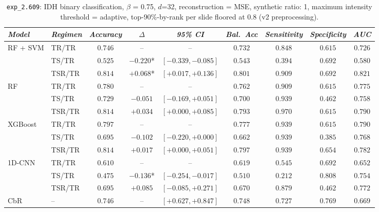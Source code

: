 \begin{table}[H]
\centering
\scriptsize

\label{tab:ctrl_exp_2.609}
\begin{tabular*}{\textwidth}{@{\extracolsep{\fill}}llccccccc}
\toprule
\emph{Model} & \emph{Regimen} & \emph{Accuracy} & \emph{$\Delta$} & \emph{95\% CI} & \emph{Bal.\ Acc} & \emph{Sensitivity} & \emph{Specificity} & \emph{AUC}\\
\midrule
\multirow{3}{*}{RF + SVM} & TR/TR & $0.746$ & -- & -- & $0.732$ & $0.848$ & $0.615$ & $0.726$\\
 & TS/TR & $0.525$ & $-0.220$* & $[-0.339, -0.085]$ & $0.543$ & $0.394$ & $0.692$ & $0.580$\\
 & TSR/TR & $0.814$ & $+0.068$* & $[+0.017, +0.136]$ & $0.801$ & $0.909$ & $0.692$ & $0.821$\\
\midrule
\multirow{3}{*}{RF} & TR/TR & $0.780$ & -- & -- & $0.762$ & $0.909$ & $0.615$ & $0.775$\\
 & TS/TR & $0.729$ & $-0.051$ & $[-0.169, +0.051]$ & $0.700$ & $0.939$ & $0.462$ & $0.758$\\
 & TSR/TR & $0.814$ & $+0.034$ & $[+0.000, +0.085]$ & $0.793$ & $0.970$ & $0.615$ & $0.790$\\
\midrule
\multirow{3}{*}{XGBoost} & TR/TR & $0.797$ & -- & -- & $0.777$ & $0.939$ & $0.615$ & $0.790$\\
 & TS/TR & $0.695$ & $-0.102$ & $[-0.220, +0.000]$ & $0.662$ & $0.939$ & $0.385$ & $0.768$\\
 & TSR/TR & $0.814$ & $+0.017$ & $[+0.000, +0.051]$ & $0.797$ & $0.939$ & $0.654$ & $0.782$\\
\midrule
\multirow{3}{*}{1D-CNN} & TR/TR & $0.610$ & -- & -- & $0.619$ & $0.545$ & $0.692$ & $0.652$\\
 & TS/TR & $0.475$ & $-0.136$* & $[-0.254, -0.017]$ & $0.510$ & $0.212$ & $0.808$ & $0.754$\\
 & TSR/TR & $0.695$ & $+0.085$ & $[-0.085, +0.271]$ & $0.670$ & $0.879$ & $0.462$ & $0.772$\\
\midrule
CbR & -- & $0.746$ & -- & $[+0.627, +0.847]$ & $0.748$ & $0.727$ & $0.769$ & $0.669$\\
\bottomrule
\end{tabular*}
\caption{\small \texttt{exp\_2.609}: IDH binary classification, $\beta$ = 0.75, $d$=32, reconstruction = MSE, synthetic ratio: 1, maximum intensity threshold = adaptive, top-90\%-by-rank per slide floored at $0.8$ (v2 preprocessing).}
\end{table}



